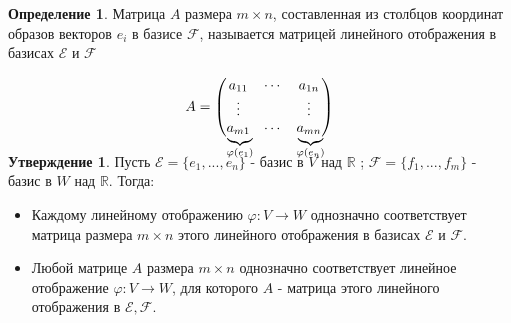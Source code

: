 \documentclass[a4paper, 12pt]{article}
\newcommand{\R}{\mathbb R}
\renewcommand{\phi}{\varphi}
\newcommand\undermat[2]{\makebox[0pt][l]{$\smash{\underbrace
{\phantom{\begin{matrix}#2\end{matrix}}}_{\text{$#1$}}}$}#2}
\theoremstyle{definition}
\newtheorem*{definition}{Определение}
\newtheorem*{subtheorem}{Утверждение}
\begin{document}
  \begin{definition}
    Матрица $A$ размера $m \times n$,  составленная из столбцов координат образов векторов $e_i$ в базисе $\mathcal{F}$, называется матрицей линейного отображения в базисах $\mathcal{E} $ и $\mathcal{F}$  
  \end{definition} 
  $$A = \begin{pmatrix}
    a_{11} & \cdots & a_{1n} \\
    \vdots & \null & \vdots \\
    \undermat{\phi(e_1)}{a_{m1}}  & \cdots & \undermat{\phi(e_n)}{a_{mn}} 
  \end{pmatrix}$$  
  \vspace{0.3cm}
  \begin{subtheorem}
    Пусть $\mathcal{E}  = \{e_1,...,e_n\}$ - базис в $V$ над $\R$ ; $\mathcal{F}  = \{f_1,...,f_m\}$ - базис в $W$ над $\R$. Тогда:
    \begin{itemize}
      \item Каждому линейному отображению $\phi: V \to W$ однозначно соответствует матрица размера $m \times n$ этого линейного отображения в базисах $\mathcal{E} \text{ и } \mathcal{F}$.
      \item Любой матрице $A$ размера $m \times n$ однозначно соответствует линейное отображение $\phi: V \to W$, для которого $A$ - матрица этого линейного отображения в $\mathcal{E}, \mathcal{F}$.
    \end{itemize}
  \end{subtheorem} 
\end{document}
